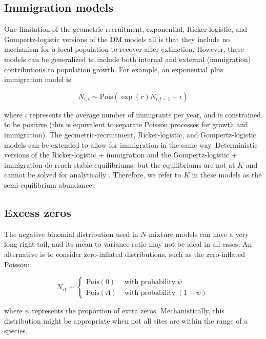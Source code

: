 \documentclass[12pt,english]{article}
\begin{document}
\begin{spacing}{1.9}
\begin{flushleft}
\subsection*{Immigration models}

One limitation of the geometric-recruitment, exponential,
Ricker-logistic, and Gompertz-logistic versions of the DM models all
is that they include no mechanism for a local population to recover
after extinction. 
However, these models can be generalized 
to include both internal and external (immigration) contributions
to population growth. For example, an exponential plus immigration
model is:
\begin{linenomath*}
\begin{equation}
  N_{i,t} \sim \mathrm{Pois}(\exp(r)N_{i,t-1} + \iota)
  \label{eq:expimm2}
\end{equation}
\end{linenomath*}
where $\iota$ represents the average number of immigrants per year, and is
constrained to be
positive (this is equivalent to separate Poisson processes for
growth and immigration).  
The geometric-recruitment, Ricker-logistic,
and Gompertz-logistic models can be extended to allow for immigration in the
same way.   Deterministic versions of the Ricker-logistic + immigration and the 
Gompertz-logistic + immigration do reach stable equilibriums, but the equilibriums 
are not at $K$ and cannot be solved for analytically \citep{otto_day:2007}.  Therefore, we
refer to $K$ in these models as the semi-equilibrium abundance.

\subsection*{Excess zeros}

The negative binomial distribution used in $N$-mixture models can have
a very long right tail, and its mean to variance ratio may not be
ideal in all cases. An alternative is to consider zero-inflated
distributions, such as the zero-inflated Poisson:
\begin{linenomath*}
\begin{equation}
N_{i1} \sim \left\{
\begin{aligned}
\mbox{Pois}(0) &\; \text{with probability} \; \psi \\
\mbox{Pois}(\Lambda) &\; \text{with probability} \; (1-\psi)
\end{aligned} \right.
\label{eq:ZIP}
\end{equation}
\end{linenomath*}
where $\psi$ represents the proportion of extra zeros. 
Mechanistically, this distribution might be appropriate when not all sites are 
within the range of a species.


\end{flushleft}
\end{spacing}
\end{document}
